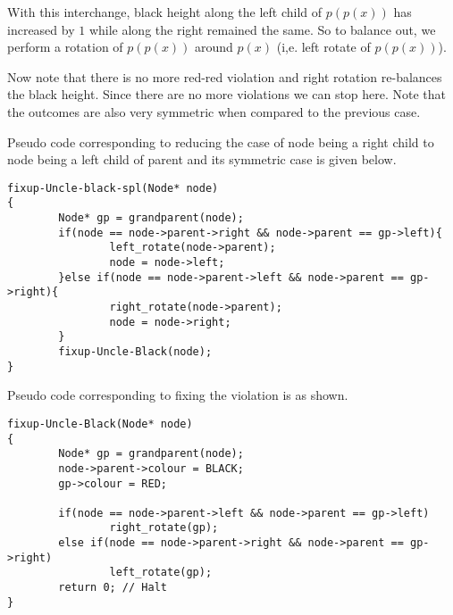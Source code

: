 \documentclass[10pt]{article}
\newcommand{\node}{\texttt{node}}
\begin{document}
With this interchange, black height along the left child of
$p(p(x))$ has increased by $1$ while along the right remained the same. So to
balance out, we perform a rotation of $p(p(x))$ around $p(x)$ (i,e. left 
rotate of $p(p(x))$).

\begin{center}
\end{center}
Now note that there is no more red-red violation and right rotation re-balances
the black height. Since there are no more violations we can stop here. Note
that the outcomes are also very symmetric when compared to the previous case. 

Pseudo code corresponding to reducing the case of
node being a right child to node being a left child of parent and its symmetric
case is given below.

\begin{verbatim}
fixup-Uncle-black-spl(Node* node)
{
        Node* gp = grandparent(node);
        if(node == node->parent->right && node->parent == gp->left){
                left_rotate(node->parent);
                node = node->left;
        }else if(node == node->parent->left && node->parent == gp->right){
                right_rotate(node->parent);
                node = node->right;
        }
        fixup-Uncle-Black(node);
}
\end{verbatim}

Pseudo code corresponding to fixing the violation is as shown.
\begin{verbatim}
fixup-Uncle-Black(Node* node)
{
        Node* gp = grandparent(node);
        node->parent->colour = BLACK;
        gp->colour = RED;

        if(node == node->parent->left && node->parent == gp->left)
                right_rotate(gp);
        else if(node == node->parent->right && node->parent == gp->right)
                left_rotate(gp);
        return 0; // Halt
}

\end{verbatim}
\end{document}
